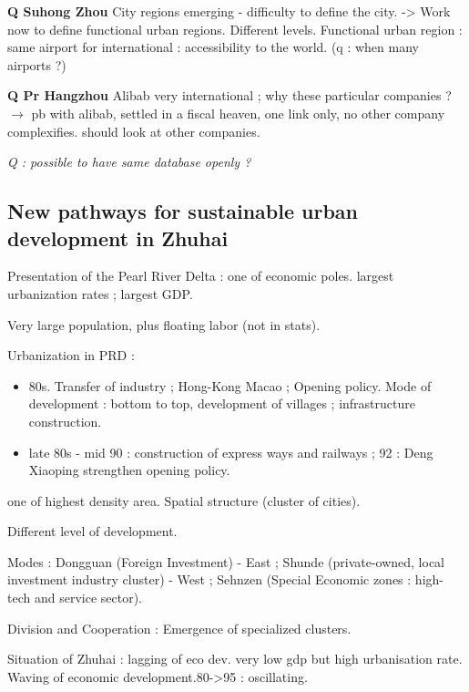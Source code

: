 \textbf{Q Suhong Zhou} City regions emerging - difficulty to define the city. -> Work now to define functional urban regions. Different levels. Functional urban region : same airport for international : accessibility to the world. (q : when many airports ?)

\textbf{Q Pr Hangzhou} Alibab very international ; why these particular companies ? $\rightarrow$ pb with alibab, settled in a fiscal heaven, one link only, no other company complexifies. should look at other companies.








\textit{Q : possible to have same database openly ?}







\subsection*{New pathways for sustainable urban development in Zhuhai}



Presentation of the Pearl River Delta : one of economic poles. largest urbanization rates ; largest GDP.

Very large population, plus floating labor (not in stats).

Urbanization in PRD :
\begin{itemize}
\item 80s. Transfer of industry ; Hong-Kong Macao ; Opening policy. Mode of development : bottom to top, development of villages ; infrastructure construction.
\item late 80s - mid 90 : construction of express ways and railways ; 92 : Deng Xiaoping strengthen opening policy.
\end{itemize}

one of highest density area. Spatial structure (cluster of cities).

Different level of development.

Modes : Dongguan (Foreign Investment) - East ; Shunde (private-owned, local investment industry cluster) - West ; Sehnzen (Special Economic zones : high-tech and service sector).


Division and Cooperation : Emergence of specialized clusters.

Situation of Zhuhai : lagging of eco dev. very low gdp but high urbanisation rate. Waving of economic development.80->95 : oscillating.

